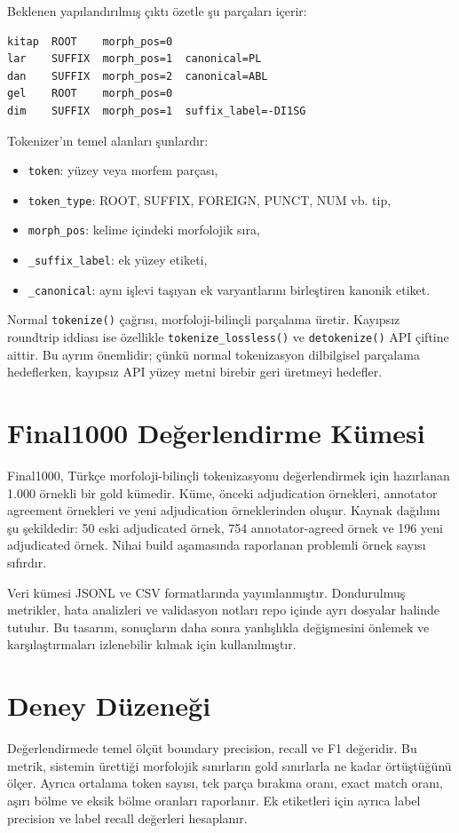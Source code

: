 \documentclass[11pt]{article}
\begin{document}
Beklenen yapılandırılmış çıktı özetle şu parçaları içerir:

\begin{verbatim}
kitap  ROOT    morph_pos=0
lar    SUFFIX  morph_pos=1  canonical=PL
dan    SUFFIX  morph_pos=2  canonical=ABL
gel    ROOT    morph_pos=0
dim    SUFFIX  morph_pos=1  suffix_label=-DI1SG
\end{verbatim}

Tokenizer'ın temel alanları şunlardır:
\begin{itemize}[leftmargin=*]
    \item \texttt{token}: yüzey veya morfem parçası,
    \item \texttt{token\_type}: ROOT, SUFFIX, FOREIGN, PUNCT, NUM vb. tip,
    \item \texttt{morph\_pos}: kelime içindeki morfolojik sıra,
    \item \texttt{\_suffix\_label}: ek yüzey etiketi,
    \item \texttt{\_canonical}: aynı işlevi taşıyan ek varyantlarını birleştiren kanonik etiket.
\end{itemize}

Normal \texttt{tokenize()} çağrısı, morfoloji-bilinçli parçalama üretir. Kayıpsız roundtrip iddiası ise özellikle \texttt{tokenize\_lossless()} ve \texttt{detokenize()} API çiftine aittir. Bu ayrım önemlidir; çünkü normal tokenizasyon dilbilgisel parçalama hedeflerken, kayıpsız API yüzey metni birebir geri üretmeyi hedefler.

\section{Final1000 Değerlendirme Kümesi}
Final1000, Türkçe morfoloji-bilinçli tokenizasyonu değerlendirmek için hazırlanan 1.000 örnekli bir gold kümedir. Küme, önceki adjudication örnekleri, annotator agreement örnekleri ve yeni adjudication örneklerinden oluşur. Kaynak dağılımı şu şekildedir: 50 eski adjudicated örnek, 754 annotator-agreed örnek ve 196 yeni adjudicated örnek. Nihai build aşamasında raporlanan problemli örnek sayısı sıfırdır.

Veri kümesi JSONL ve CSV formatlarında yayımlanmıştır. Dondurulmuş metrikler, hata analizleri ve validasyon notları repo içinde ayrı dosyalar halinde tutulur. Bu tasarım, sonuçların daha sonra yanlışlıkla değişmesini önlemek ve karşılaştırmaları izlenebilir kılmak için kullanılmıştır.

\section{Deney Düzeneği}
Değerlendirmede temel ölçüt boundary precision, recall ve F1 değeridir. Bu metrik, sistemin ürettiği morfolojik sınırların gold sınırlarla ne kadar örtüştüğünü ölçer. Ayrıca ortalama token sayısı, tek parça bırakma oranı, exact match oranı, aşırı bölme ve eksik bölme oranları raporlanır. Ek etiketleri için ayrıca label precision ve label recall değerleri hesaplanır.
\end{document}
